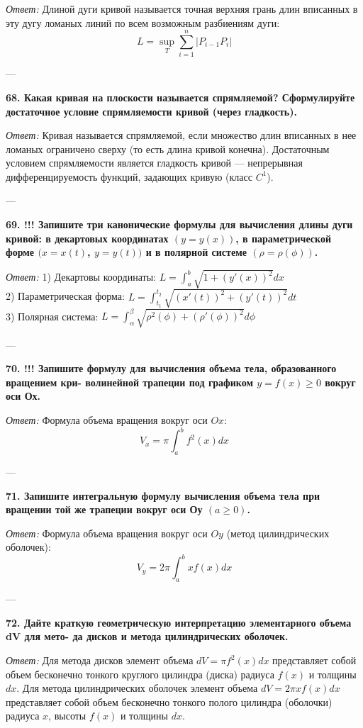\documentclass{article}
\begin{document}
\textit{Ответ:} Длиной дуги кривой называется точная верхняя грань длин вписанных в эту дугу ломаных линий по всем возможным разбиениям дуги:
$$ L = \sup_{T} \sum_{i=1}^n |P_{i-1}P_i| $$

---

\textbf{68. Какая кривая на плоскости называется спрямляемой? Сформулируйте достаточное условие спрямляемости кривой (через гладкость).}

\textit{Ответ:} Кривая называется спрямляемой, если множество длин вписанных в нее ломаных ограничено сверху (то есть длина кривой конечна). Достаточным условием спрямляемости является гладкость кривой — непрерывная дифференцируемость функций, задающих кривую (класс $C^1$).

---

\textbf{69. !!! Запишите три канонические формулы для вычисления длины дуги кривой: в декартовых координатах $(y=y(x))$, в параметрической форме $(x=x(t)$, $y=y(t))$ и в полярной системе $(\rho=\rho(\phi))$.}

\textit{Ответ:}
1) Декартовы координаты: $L = \int_a^b \sqrt{1 + (y'(x))^2} dx$ \\
2) Параметрическая форма: $L = \int_{t_1}^{t_2} \sqrt{(x'(t))^2 + (y'(t))^2} dt$ \\
3) Полярная система: $L = \int_{\alpha}^{\beta} \sqrt{\rho^2(\phi) + (\rho'(\phi))^2} d\phi$

---

\textbf{70. !!! Запишите формулу для вычисления объема тела, образованного вращением кри- волинейной трапеции под графиком $y=f(x)\ge0$ вокруг оси Ох.}

\textit{Ответ:} Формула объема вращения вокруг оси $Ox$:
$$ V_x = \pi \int_a^b f^2(x) dx $$

---

\textbf{71. Запишите интегральную формулу вычисления объема тела при вращении той же трапеции вокруг оси Оу $(a\ge0)$.}

\textit{Ответ:} Формула объема вращения вокруг оси $Oy$ (метод цилиндрических оболочек):
$$ V_y = 2\pi \int_a^b x f(x) dx $$

---

\textbf{72. Дайте краткую геометрическую интерпретацию элементарного объема dV для мето- да дисков и метода цилиндрических оболочек.}

\textit{Ответ:} Для метода дисков элемент объема $dV = \pi f^2(x) dx$ представляет собой объем бесконечно тонкого круглого цилиндра (диска) радиуса $f(x)$ и толщины $dx$. Для метода цилиндрических оболочек элемент объема $dV = 2\pi x f(x) dx$ представляет собой объем бесконечно тонкого полого цилиндра (оболочки) радиуса $x$, высоты $f(x)$ и толщины $dx$.
\end{document}
